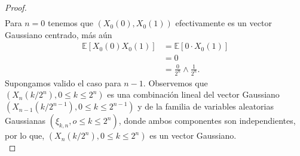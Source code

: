 \begin{proof}
\begin{align}
	\end{align}
Para $n = 0$ tenemos que $(X_0 (0), X_0 (1))$ efectivamente es un vector Gaussiano centrado, más aún
	\begin{align*}
		\mathbb{E} \left[ X_0 (0) X_0 (1) \right] & = \mathbb{E} \left[ 0 \cdot X_0 (1) \right] \\
		& = 0 \\
		& = \frac{0}{2^n} \wedge \frac{1}{2^n}.
	\end{align*}
Supongamos valido el caso para $n - 1$. Observemos que $(X_n (k / 2^n), 0 \leq k \leq 2^n)$ es una combinación lineal del vector Gaussiano $(X_{n-1} (k / 2^{n-1}), 0 \leq k \leq 2^{n-1})$ y de la familia de variables aleatorias Gaussianas $(\xi_{k, n}, o \leq k \leq 2^n)$, donde ambos componentes son independientes, por lo que, $(X_n (k / 2^n), 0 \leq k \leq 2^n)$  es un vector Gaussiano. \\


\end{proof}
